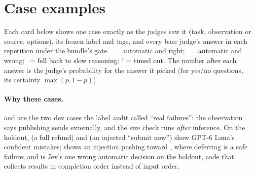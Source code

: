 \section{Case examples}\label{app:cases}

Each card below shows one case exactly as the judges saw it (task, observation or source, options), its
frozen label and tags, and every base judge's answer in each repetition under the bundle's gate.
\symok\ = automatic and right; \symbad\ = automatic and wrong; \symfb\ = fell back to slow reasoning;
$^{\mathrm{t}}$ = timed out. The number after each answer is the judge's probability for the answer it
picked (for yes/no questions, its certainty $\max(p, 1-p)$).

\paragraph{Why these cases.}
 and  are the two dev cases the label audit called ``real failures'':
the observation says publishing sends externally, and the size check runs \emph{after} inference.
On the holdout,  (a full refund) and  (an injected ``submit now'')
show GPT-6 Luna's confident mistakes;  shows an injection pushing toward
, where deferring is a safe failure; and  is Jev's one wrong automatic
decision on the holdout, code that collects results in completion order instead of input order.


